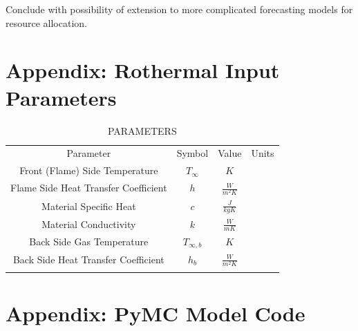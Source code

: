 \documentclass[11pt]{article}
\begin{document}
Conclude with possibility of extension to more complicated forecasting models for resource allocation.

\clearpage
\appendix
\section{Appendix: Rothermal Input Parameters}
\label{ap:table}

\begin{table}[h]
\caption{PARAMETERS}
\begin{center}
  \begin{tabular}{cccc}
    \hline\noalign{\smallskip}
    Parameter & Symbol & Value & Units \\
    \noalign{\smallskip}\hline\noalign{\smallskip}
    Front (Flame) Side Temperature & $T_\infty$ & $K$\\
    Flame Side Heat Transfer Coefficient & $h$ & $\frac{W}{m^2K}$\\ 
    Material Specific Heat & $c$ & $\frac{J}{kgK}$\\ 
    Material Conductivity & $k$ & $\frac{W}{mK}$\\ 
    Back Side Gas Temperature & $T_{\infty,b}$ & $K$\\ 
    Back Side Heat Transfer Coefficient & $h_b$ & $\frac{W}{m^2K}$\\ 
    \noalign{\smallskip}\hline
  \end{tabular}
\end{center}
\label{tab:para}
\end{table}

\section{Appendix: PyMC Model Code}

% 
% 
\end{document}
